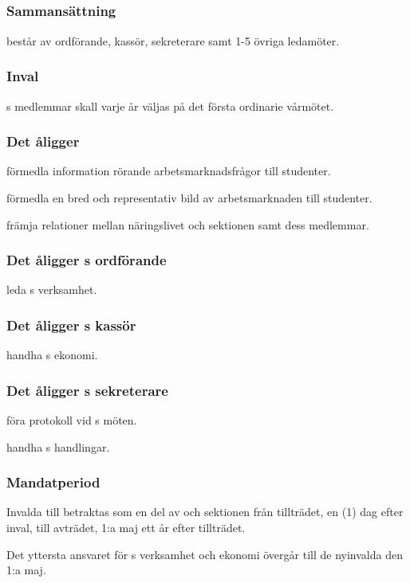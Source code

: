 \subsection{\ARMITFULL{}}
\subsubsection{Sammansättning}
\ARMIT{} består av ordförande, kassör, sekreterare samt 1-5 övriga ledamöter.

\subsubsection{Inval}
\ARMIT{}s medlemmar skall varje år väljas på det första ordinarie vårmötet.

\subsubsection{Det åligger \ARMIT{}}
\begin{att}
	\item förmedla information rörande arbetsmarknadsfrågor till studenter.
	\item förmedla en bred och representativ bild av arbetsmarknaden till studenter.
	\item främja relationer mellan näringslivet och sektionen samt dess medlemmar.
\end{att}

\subsubsection{Det åligger \ARMIT{}s ordförande}
\begin{att}
	\item leda \ARMIT{}s verksamhet.
\end{att}

\subsubsection{Det åligger \ARMIT{}s kassör}
\begin{att}
	\item handha \ARMIT{}s ekonomi.
\end{att}

\subsubsection{Det åligger \ARMIT{}s sekreterare}
\begin{att}
	\item föra protokoll vid \ARMIT{}s möten.
	\item handha \ARMIT{}s handlingar.
\end{att}

\subsubsection{Mandatperiod}
Invalda till \ARMIT{} betraktas som en del av \ARMIT{} och sektionen från tillträdet, en (1) dag efter inval, till avträdet, 1:a maj ett år efter tillträdet.

Det yttersta ansvaret för \ARMIT{}s verksamhet och ekonomi övergår till de nyinvalda den 1:a maj.
